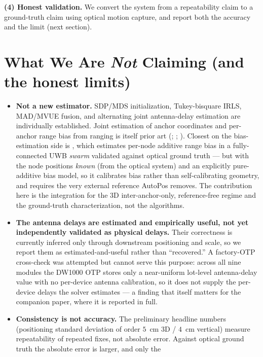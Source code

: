 \documentclass[11pt,a4paper]{article}
\begin{document}
\textbf{(4) Honest validation.} We convert the system from a repeatability claim to a ground-truth
claim using optical motion capture, and report both the accuracy and the limit (next section).

\section{What We Are \emph{Not} Claiming (and the honest limits)}

\begin{itemize}
\item \textbf{Not a new estimator.} SDP/MDS initialization, Tukey-bisquare IRLS, MAD/MVUE fusion, and
      alternating joint antenna-delay estimation are individually established. Joint estimation of
      anchor coordinates and per-anchor range bias from ranging is itself prior art
      (\citealp{de_preter_2019}; \citealp{piavanini_2022}; \citealp{shah_2022}). Closest on the
      bias-estimation side is \citet{yogesh_2024}, which estimates per-node additive range bias in a
      fully-connected UWB \emph{swarm} validated against optical ground truth --- but with the node
      positions \emph{known} (from the optical system) and an explicitly pure-additive bias model, so
      it calibrates bias rather than self-calibrating geometry, and requires the very external
      reference AutoPos removes. The contribution here is the integration for the 3D inter-anchor-only,
      reference-free regime and the ground-truth characterization, not the algorithms.
\item \textbf{The antenna delays are estimated and empirically useful, not yet independently
      validated as physical delays.} Their correctness is currently inferred only through downstream
      positioning and scale, so we report them as estimated-and-useful rather than ``recovered.'' A
      factory-OTP cross-check was attempted but cannot serve this purpose: across all nine modules the
      DW1000 OTP stores only a near-uniform lot-level antenna-delay value with no per-device antenna
      calibration, so it does not supply the per-device delays the solver estimates --- a finding that
      itself matters for the companion paper, where it is reported in full.
\item \textbf{Consistency is not accuracy.} The preliminary headline numbers (positioning standard
      deviation of order $5$~cm 3D / $4$~cm vertical) measure repeatability of repeated fixes, not
      absolute error. Against optical ground truth the absolute error is larger, and only the

\end{itemize}
\end{document}
